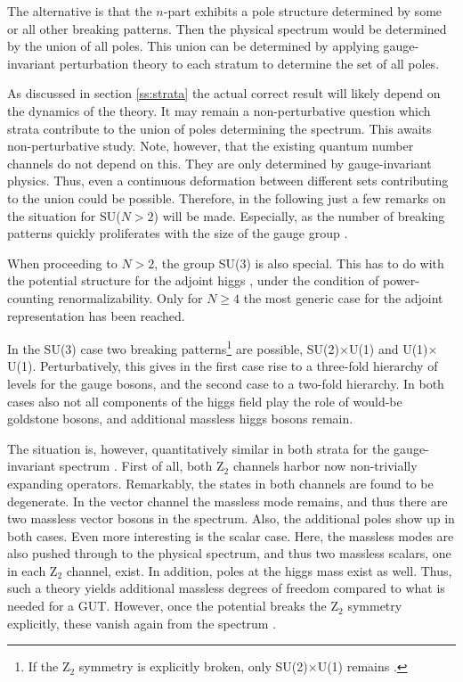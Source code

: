 \documentclass[final,12pt,3p,longtitle]{elsarticle}
\newcommand*{\1}{1\!\!\!\bot}
\begin{document}
The alternative is that the $n$-part exhibits a pole structure determined by some or all other breaking patterns. Then the physical spectrum would be determined by the union of all poles. This union can be determined by applying gauge-invariant perturbation theory to each stratum to determine the set of all poles.

As discussed in section \ref{ss:strata} the actual correct result will likely depend on the dynamics of the theory. It may remain a non-perturbative question which strata contribute to the union of poles determining the spectrum. This awaits non-perturbative study. Note, however, that the existing quantum number channels do not depend on this. They are only determined by gauge-invariant physics. Thus, even a continuous deformation between different sets contributing to the union could be possible. Therefore, in the following just a few remarks on the situation for SU($N>2$) will be made. Especially, as the number of breaking patterns quickly proliferates with the size of the gauge group \cite{Li:1973mq,Ruegg:1980gf,Murphy:1983rf,O'Raifeartaigh:1986vq,Kojima:2016fvv,Maas:2017xzh}.

When proceeding to $N>2$, the group SU(3) is also special. This has to do with the potential structure for the adjoint higgs \cite{O'Raifeartaigh:1986vq,Maas:2017xzh}, under the condition of power-counting renormalizability. Only for $N\ge 4$ the most generic case for the adjoint representation has been reached.

In the SU(3) case two breaking patterns\footnote{If the Z$_2$ symmetry is explicitly broken, only SU(2)$\times$U(1) remains \cite{O'Raifeartaigh:1986vq}.} are possible, SU(2)$\times$U(1) and U(1)$\times$U(1). Perturbatively, this gives in the first case rise to a three-fold hierarchy of levels for the gauge bosons, and the second case to a two-fold hierarchy. In both cases also not all components of the higgs field play the role of would-be goldstone bosons, and additional massless higgs bosons remain.

The situation is, however, quantitatively similar in both strata for the gauge-invariant spectrum \cite{Maas:2017xzh}. First of all, both Z$_2$ channels harbor now non-trivially expanding operators. Remarkably, the states in both channels are found to be degenerate. In the vector channel the massless mode remains, and thus there are two massless vector bosons in the spectrum. Also, the additional poles show up in both cases. Even more interesting is the scalar case. Here, the massless modes are also pushed through to the physical spectrum, and thus two massless scalars, one in each Z$_2$ channel, exist. In addition, poles at the higgs mass exist as well. Thus, such a theory yields additional massless degrees of freedom compared to what is needed for a GUT. However, once the potential breaks the Z$_2$ symmetry explicitly, these vanish again from the spectrum \cite{Maas:2017xzh}. 
\end{document}
